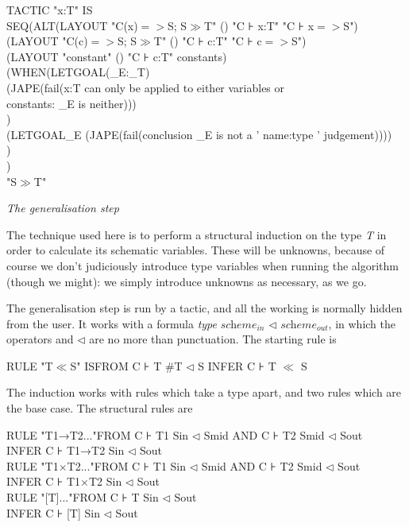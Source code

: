 \documentclass[11pt]{book}
\newcommand{\tab}{\hspace{5mm}}
\begin{document}
TACTIC "x:T" IS\\
\tab SEQ\tab (ALT\tab (LAYOUT "C(x)$=>$S; S$\gg$T" () "C ⊦ x:T" "C ⊦ x$=>$S") \\
\tab \tab \tab (LAYOUT "C(c)$=>$S; S$\gg$T" () "C ⊦ c:T" "C ⊦ c$=>$S")\\
\tab \tab \tab (LAYOUT "constant" () "C ⊦ c:T" constants)\\
\tab \tab \tab (WHEN\tab (LETGOAL\tab (\_E:\_T)\\
\tab \tab \tab \tab \tab (JAPE(fail(x:T can only be applied to either variables or\\
\tab \tab \tab \tab \tab \tab \tab constants: \_E is neither)))\\
\tab \tab \tab \tab )\\
\tab \tab \tab \tab (LETGOAL\tab \_E (JAPE(fail(conclusion \_E is not a ' name:type ' judgement))))\\
\tab \tab \tab )\\
\tab \tab ) \\
\tab \tab "S$\gg$T"


\textit{The generalisation step}


The technique used here is to perform a structural induction on the type \textit{T} in order to calculate its schematic variables. These will be unknowns, because of course we don't judiciously introduce type variables when running the algorithm (though we might): we simply introduce unknowns as necessary, as we go.


The generalisation step is run by a tactic, and all the working is normally hidden from the user. It works with a formula \textit{type} {\textbullet} $\textit{scheme}_{\textit{in}}$ $\triangleleft$ $\textit{scheme}_{\textit{out}}$, in which the operators {\textbullet} and $\triangleleft$ are no more than punctuation. The starting rule is

RULE "T$\ll$S" IS\tab FROM C ⊦ T {\textbullet} \#T $\triangleleft$ S \tab INFER C ⊦ T $\ll$ S


The induction works with rules which take a type apart, and two rules which are the base case. The structural rules are

RULE "T1→T2{\textbullet}..."\tab FROM C ⊦ T1{\textbullet} Sin $\triangleleft$ Smid AND C ⊦ T2 {\textbullet} Smid $\triangleleft$ Sout\\
\tab \tab INFER C ⊦ T1→T2 {\textbullet} Sin $\triangleleft$ Sout\\
RULE "T1$\times$T2{\textbullet}..."\tab FROM C ⊦ T1{\textbullet} Sin $\triangleleft$ Smid AND C ⊦ T2 {\textbullet} Smid $\triangleleft$ Sout\\
\tab \tab INFER C ⊦ T1$\times$T2 {\textbullet} Sin $\triangleleft$ Sout\\
RULE "[T]{\textbullet}..."\tab FROM C ⊦ T {\textbullet} Sin $\triangleleft$ Sout\\
\tab \tab INFER C ⊦ [T] {\textbullet} Sin $\triangleleft$ Sout
\end{document}
